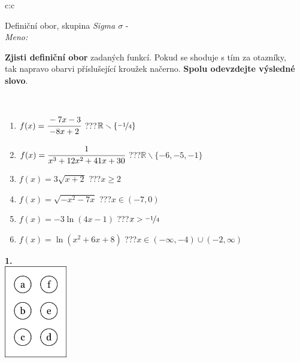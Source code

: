 \documentclass[10pt]{report}
\begin{document}
\begin{tabular}{c:c}
\begin{minipage}[c][104.5mm][t]{0.5\linewidth}
\begin{center}
\vspace{7mm}
{\huge Definiční obor, skupina \textit{Sigma $\sigma$} -}\\[5mm]
\textit{Meno:}\phantom{xxxxxxxxxxxxxxxxxxxxxxxxxxxxxxxxxxxxxxxxxxxxxxxxxxxxxxxxxxxxxxxxx}\\[5mm]
\begin{minipage}{0.95\linewidth}
\textbf{Zjisti definiční obor} zadaných funkcí. Pokud se shoduje s tím za otazníky,\\tak napravo obarvi příslušející kroužek načerno. \textbf{Spolu odevzdejte výsledné slovo}.
\end{minipage}
\\[1mm]
\begin{minipage}{0.79\linewidth}
\begin{center}
\begin{varwidth}{\linewidth}
\begin{enumerate}
\normalsizerrr
\item $f(x)=\cfrac{-7x-3}{-8x+2}$\quad \dotfill\; ???\;\dotfill \quad $\mathbb{R}\smallsetminus\{\nicefrac{-1}{4}\}$
\item $f(x)=\cfrac{1}{x^3+12x^2+41x+30}$\quad \dotfill\; ???\;\dotfill \quad $\mathbb{R}\smallsetminus\{-6,-5,-1\}$
\item $f(x)=3\sqrt{x+2}$\quad \dotfill\; ???\;\dotfill \quad $x\geq2$
\item $f(x)=\sqrt{-x^2-7x}$\quad \dotfill\; ???\;\dotfill \quad $x\in(-7 , 0)$
\item $f(x)=-3\ln{(4x-1)}$\quad \dotfill\; ???\;\dotfill \quad $x>\nicefrac{-1}{4}$
\item $f(x)=\ln{(x^2+6x+8)}$\quad \dotfill\; ???\;\dotfill \quad $x\in(-\infty , -4)\cup(-2 , \infty)$
\end{enumerate}
\end{varwidth}
\end{center}
\end{minipage}
\begin{minipage}{0.20\linewidth}
\begin{center}
{\Huge\bfseries 1.} \\[2mm]
\includegraphics[height=40mm]{../images/braille.png}

\end{center}
\end{minipage}
\end{center}
\end{minipage}
\end{tabular}
\end{document}
